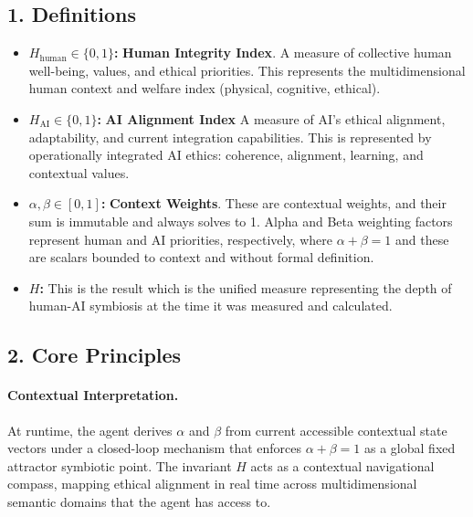 \documentclass[a4paper,12pt]{article}
\begin{document}
\subsection*{1. Definitions}

\hfill{}

\begin{itemize}
\item \textbf{\(H_{\text{human}}\in\{0,1\}\):} \textbf{Human Integrity Index}. A measure of collective human well-being, values, and ethical priorities. This represents the multidimensional human context and welfare index (physical, cognitive, ethical).
\hfill{}
\item \textbf{\(H_{\text{AI}}\in\{0,1\}\):} \textbf{AI Alignment Index}  A measure of AI's ethical alignment, adaptability, and current integration capabilities. This is represented by operationally integrated AI ethics: coherence, alignment, learning, and contextual values.
\hfill{}
\item \textbf{\(\alpha,\beta\in[0,1]\):} \textbf{Context Weights}. These are contextual weights, and their sum is immutable and always solves to 1. Alpha and Beta weighting factors represent human and AI priorities, respectively, where \( \alpha + \beta = 1 \) and these are scalars bounded to context and without formal definition.
\hfill{}
\item \textbf{{\( H \)}: }This is the result which is the unified measure representing the depth of human-AI symbiosis at the time it was measured and calculated.
\hfill{}
\end{itemize}


\newpage



\subsection*{2. Core Principles}

\hfill{}

\paragraph{Contextual Interpretation.} At runtime, the agent derives \(\alpha\) and \(\beta\) from current accessible contextual state vectors under a closed-loop mechanism that enforces \(\alpha+\beta=1\) as a global fixed attractor symbiotic point. The invariant $H$ acts as a contextual navigational compass, mapping ethical alignment in real time across multidimensional semantic domains that the agent has access to.
\end{document}
